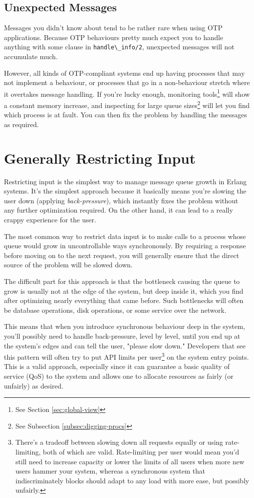 \documentclass[11pt, oneside]{book}   	%
\newcommand{\function}[1]{\Verb`#1`}
\begin{document}
\subsection{Unexpected Messages}

Messages you didn't know about tend to be rather rare when using OTP applications. Because OTP behaviours pretty much expect you to handle anything with some clause in \function{handle\_info/2}, unexpected messages will not accumulate much.

However, all kinds of OTP-compliant systems end up having processes that may not implement a behaviour, or processes that go in a non-behaviour stretch where it overtakes message handling. If you're lucky enough, monitoring tools\footnote{See Section \ref{sec:global-view}} will show a constant memory increase, and inspecting for large queue sizes\footnote{See Subsection \ref{subsec:digging-procs}} will let you find which process is at fault. You can then fix the problem by handling the messages as required.

\section{Generally Restricting Input}

Restricting input is the simplest way to manage message queue growth in Erlang systems. It's the simplest approach because it basically means you're slowing the user down (applying \emph{back-pressure}), which instantly fixes the problem without any further optimization required. On the other hand, it can lead to a really crappy experience for the user.

The most common way to restrict data input is to make calls to a process whose queue would grow in uncontrollable ways synchronously. By requiring a response before moving on to the next request, you will generally ensure that the direct source of the problem will be slowed down.

The difficult part for this approach is that the bottleneck causing the queue to grow is usually not at the edge of the system, but deep inside it, which you find after optimizing nearly everything that came before. Such bottlenecks will often be database operations, disk operations, or some service over the network. 

This means that when you introduce synchronous behaviour deep in the system, you'll possibly need to handle back-pressure, level by level, until you end up at the system's edges and can tell the user, "please slow down."
Developers that see this pattern will often try to put API limits per user\footnote{There's a tradeoff between slowing down all requests equally or using rate-limiting, both of which are valid. Rate-limiting per user would mean you'd still need to increase capacity or lower the limits of all users when more new users hammer your system, whereas a synchronous system that indiscriminately blocks should adapt to any load with more ease, but possibly unfairly.} on the system entry points. This is a valid approach, especially since it can guarantee a basic quality of service (QoS) to the system and allows one to allocate resources as fairly (or unfairly) as desired.
  
\end{document}
